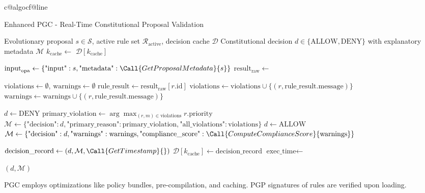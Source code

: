 \documentclass[sigconf,natbib]{acmart}
\makeatletter
\newcommand{\resetalglineno}{\setcounter{ALG@line}{0}}
\renewcommand{\resetalglineno}{%
  \setcounter{ALG@line}{0}%
  \ifcsname c@algocf@line\endcsname\setcounter{algocf@line}{0}\fi%
}
\makeatother
\begin{document}
\begin{algorithm}[!htbp]
\resetalglineno
\caption{Enhanced PGC - Real-Time Constitutional Proposal Validation}
\label{alg:pgc_validation}
\begin{algorithmic}[1]
\Require Evolutionary proposal $s \in \mathcal{S}$, active rule set $\mathcal{R}_{\text{active}}$, decision cache $\mathcal{D}$
\Ensure Constitutional decision $d \in \{\text{ALLOW}, \text{DENY}\}$ with explanatory metadata $\mathcal{M}$
  \State $k_{\text{cache}} \gets$  
    \State {}
    \State \Return $\mathcal{D}[k_{\text{cache}}]$ 
  \EndIf

  \State $\text{input}_{\text{opa}} \gets \{\text{"input"}: s, \text{"metadata"}: \Call{GetProposalMetadata}{s}\}$
  \State $\text{result}_{\text{raw}} \gets$ 

  \State $\text{violations} \gets \emptyset$, $\text{warnings} \gets \emptyset$
    \State $\text{rule\_result} \gets \text{result}_{\text{raw}}[r.\text{id}]$
      \State $\text{violations} \gets \text{violations} \cup \{(r, \text{rule\_result}.\text{message})\}$
      \State $\text{warnings} \gets \text{warnings} \cup \{(r, \text{rule\_result}.\text{message})\}$
    \EndIf
  \EndFor

    \State $d \gets \text{DENY}$
    \State $\text{primary\_violation} \gets \arg\max_{(r,m) \in \text{violations}} r.\text{priority}$
    \State $\mathcal{M} \gets \{\text{"decision"}: d, \text{"primary\_reason"}: \text{primary\_violation}, \text{"all\_violations"}: \text{violations}\}$
  \Else
    \State $d \gets \text{ALLOW}$
    \State $\mathcal{M} \gets \{\text{"decision"}: d, \text{"warnings"}: \text{warnings}, \text{"compliance\_score"}: \Call{ComputeComplianceScore}{\text{warnings}}\}$
  \EndIf

  \State $\text{decision\_record} \gets (d, \mathcal{M}, \Call{GetTimestamp}{})$
  \State $\mathcal{D}[k_{\text{cache}}] \gets \text{decision\_record}$
  \State {}
  \State $\text{exec\_time} \gets$ 
  \State {}

  \State \Return $(d, \mathcal{M})$
\EndFunction
\end{algorithmic}
\end{algorithm}
PGC employs optimizations like policy bundles, pre-compilation, and caching. PGP signatures of rules are verified upon loading.
\end{document}
